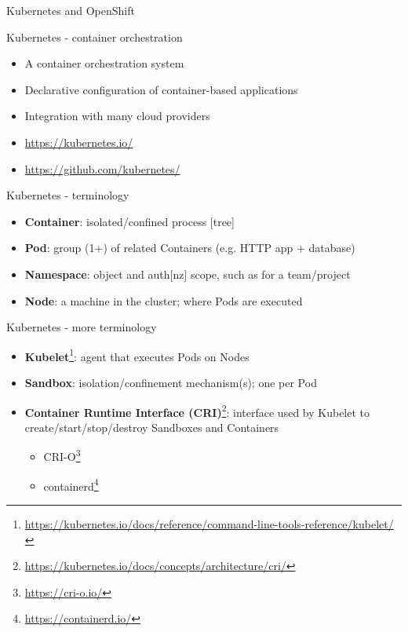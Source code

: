 \documentclass[ignorenonframetext,aspectratio=169,12pt]{beamer}
\begin{document}
\begin{frame}[plain]
\centering
\huge Kubernetes and OpenShift
\end{frame}


\begin{frame}{Kubernetes - container orchestration}
\protect\hypertarget{kubernetes-intro}{}

\begin{itemize}
\item A container orchestration system
\item Declarative configuration of container-based applications
\item Integration with many cloud providers
\item \url{https://kubernetes.io/}
\item \url{https://github.com/kubernetes/}
\end{itemize}

\end{frame}


\begin{frame}{Kubernetes - terminology}
\protect\hypertarget{kubernetes-terminology}{}

\begin{itemize}
\item {\bf Container}: isolated/confined process [tree]
\item {\bf Pod}: group (1+) of related Containers (e.g. HTTP app + database)
\item {\bf Namespace}: object and auth[nz] scope, such as for a team/project
\item {\bf Node}: a machine in the cluster; where Pods are executed
\end{itemize}

\end{frame}

\begin{frame}{Kubernetes - more terminology}
\protect\hypertarget{kubernetes-terminology-2}{}
\begin{itemize}

\item {\bf
  Kubelet}\footnote{\url{https://kubernetes.io/docs/reference/command-line-tools-reference/kubelet/}}:
  agent that executes Pods on Nodes

\item {\bf Sandbox}: isolation/confinement mechanism(s); one per Pod
\item {\bf Container Runtime Interface
  (CRI)}\footnote{\url{https://kubernetes.io/docs/concepts/architecture/cri/}}:
  interface used by Kubelet to create/start/stop/destroy Sandboxes and
  Containers
  \begin{itemize}
  \item CRI-O\footnote{\url{https://cri-o.io/}}
  \item containerd\footnote{\url{https://containerd.io/}}
  \end{itemize}
\end{itemize}
\end{frame}
\end{document}
